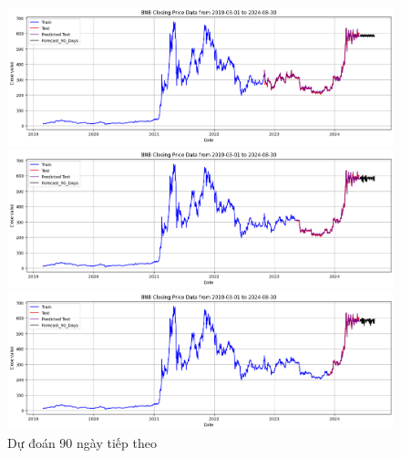 \documentclass[conference]{IEEEtran}
\begin{document}
\begin{figure}[H]
    \centering
    \begin{minipage}{0.15\textwidth}
    \centering
    \includegraphics[width=1\textwidth]{Figure/RandomForest_BNB_90days_73.png}
    \end{minipage}
    \hfill
    \begin{minipage}{0.15\textwidth}
    \centering
    \includegraphics[width=1\textwidth]{Figure/RandomForest_BNB_90days_82.png}
    \end{minipage}
    \hfill
    \begin{minipage}{0.15\textwidth}
    \centering
    \includegraphics[width=1\textwidth]{Figure/RandomForest_BNB_90days_91.png}
    \end{minipage}
    \caption{Dự đoán 90 ngày tiếp theo}
    \label{fig:1}
\end{figure}
\end{document}
